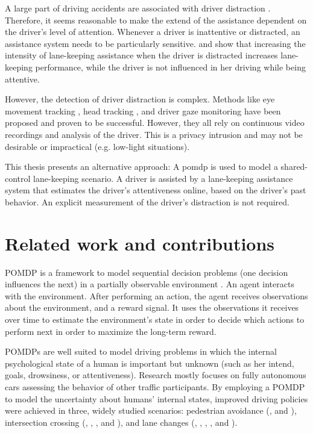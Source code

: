 A large part of driving accidents are associated with driver distraction \parencite{distracted_nhtsa}. Therefore, it seems reasonable to make the extend of the assistance dependent on the driver's level of attention. Whenever a driver is inattentive or distracted, an assistance system needs to be particularly sensitive. \cite{disracted-lane-keeping-1} and \cite{disracted-lane-keeping-2} show that increasing the intensity of lane-keeping assistance when the driver is distracted increases lane-keeping performance, while the driver is not influenced in her driving while being attentive. 

However, the detection of driver distraction is complex. Methods like eye movement tracking \parencite{eye-movement}, head tracking \parencite{head-tracking}, and driver gaze monitoring \parencite{gaze-monitoring} have been proposed and proven to be successful. However, they all rely on continuous video recordings and analysis of the driver. This is a privacy intrusion and may not be desirable or impractical (e.g. low-light situations). 

This thesis presents an alternative approach: A \Gls{pomdp} is used to model a shared-control lane-keeping scenario. A driver is assisted by a lane-keeping assistance system that estimates the driver's attentiveness online, based on the driver's past behavior. An explicit measurement of the driver's distraction is not required.

\section{Related work and contributions}

POMDP is a framework to model sequential decision problems (one decision influences the next) in a partially observable environment \parencite{pomdp-definition}. An agent interacts with the environment. After performing an action, the agent receives observations about the environment, and a reward signal. It uses the observations it receives over time to estimate the environment's state in order to decide which actions to perform next in order to maximize the long-term reward.

POMDPs are well suited to model driving problems in which the internal psychological state of a human is important but unknown (such as her intend, goals, drowsiness, or attentiveness). Research mostly focuses on fully autonomous cars assessing the behavior of other traffic participants. By employing a POMDP to model the uncertainty about humans' internal states, improved driving policies were achieved in three, widely studied scenarios: pedestrian avoidance (\cite{despot-crowd}, and \cite{pomdp-pedestrian-avoid-2}), intersection crossing (\cite{pomdp-intersection}, \cite{att_intersec}, \cite{pomdp-intersection-2}, and \cite{pomdp-intersection-3}), and lane changes (\cite{pomdp-lane-changes}, \cite{att_intersec}, \cite{pomdp-lane-changes-2}, \cite{tactical-decision}, and \cite{pomdp_towards_human}). 

